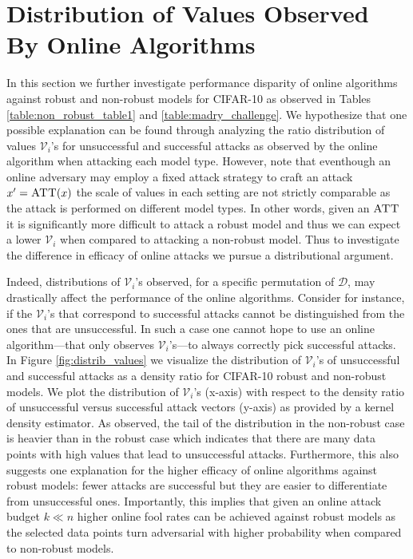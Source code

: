 \clearpage

\section{Distribution of Values Observed By Online Algorithms}
\label{appendix:visualization_of_values_observed} 
In this section we further investigate performance disparity of online algorithms against robust and non-robust models for CIFAR-10 as observed in Tables \ref{table:non_robust_table1} and \ref{table:madry_challenge}. We hypothesize that one possible explanation can be found through analyzing the ratio distribution of values $\mathcal{V}_i$'s for unsuccessful and successful attacks as observed by the online algorithm when attacking each model type. However, note that eventhough an online adversary may employ a fixed attack strategy to craft an attack $x'=\textsc{ATT}(x)$ the scale of values in each setting are not strictly comparable as the attack is performed on different model types.
In other words, given an $\textsc{ATT}$ it is significantly more difficult to attack a robust model and thus we can expect a lower $\mathcal{V}_i$ when compared to attacking a non-robust model. Thus to investigate the difference in efficacy of online attacks we pursue a distributional argument. %

Indeed, distributions of $\mathcal{V}_i$'s observed, for a specific permutation of $\mathcal{D}$, may drastically affect the performance of the online algorithms. Consider for instance, if the $\mathcal{V}_i$'s that correspond to successful attacks cannot be distinguished from the ones that are unsuccessful. In such a case one cannot hope to use an online algorithm---that only observes $\mathcal{V}_i$'s---to always correctly pick successful attacks. In Figure \ref{fig:distrib_values} we visualize the distribution of $\mathcal{V}_i$'s of unsuccessful and successful attacks as a density ratio for CIFAR-10 robust and non-robust models. We plot the distribution of $\mathcal{V}_i$'s (x-axis) with respect to the density ratio of unsuccessful versus successful attack vectors (y-axis) as provided by a kernel density estimator. As observed, the tail of the distribution in the non-robust case is heavier than in the robust case which indicates that there are many data points with high values that lead to unsuccessful attacks. Furthermore, this also suggests one explanation for the higher efficacy of online algorithms against robust models: fewer attacks are successful but they are easier to differentiate from unsuccessful ones. Importantly, this implies that given an online attack budget $k \ll n$ higher online fool rates can be achieved against robust models as the selected data points turn adversarial with higher probability when compared to non-robust models. 


